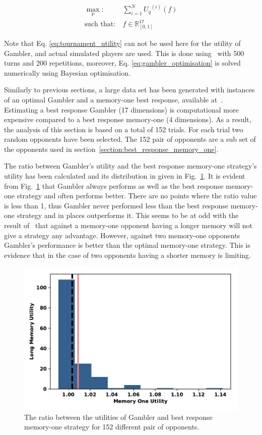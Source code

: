 \documentclass[10pt]{article}
\newcommand{\R}{\mathbb{R}}
\begin{document}
\begin{equation}\label{eq:gambler_optimisation}
    \begin{aligned}
    \max_p: & \ \sum_{i=1} ^ {N} {U_q}^{(i)} (f)
    \\
    \text{such that}: & \ f \in \R_{[0, 1]}^{17}
    \end{aligned}
\end{equation}

Note that Eq. \ref{eq:tournament_utility} can not be used here for the utility
of Gambler, and actual simulated players are used. This is done using~\cite{axelrodproject}
with 500 turns and 200 repetitions, moreover, Eq. \ref{eq:gambler_optimisation}
is solved numerically using Bayesian optimisation.

Similarly to previous sections, a large data set has been generated with
instances of an optimal Gambler and a memory-one best response, available
at~\cite{glynatsi2019}. Estimating a best response Gambler (17 dimensions) is
computational more expensive compared to a best response memory-one (4
dimensions). As a result, the analysis of this section is based on a total of
152 trials. For each trial two random opponents have been selected. The 152 pair
of opponents are a sub set of the opponents used in section~\ref{section:best_response_memory_one}.

The ratio between Gambler's utility and the best response memory-one strategy's utility has been calculated and its distribution in
given in Fig.~\ref{fig:utilities_gambler_mem_one}.
It is evident from Fig.~\ref{fig:utilities_gambler_mem_one} that
Gambler always performs as well as the best response memory-one strategy and often performs better. There are
no points where the ratio value is less than 1, thus Gambler never performed less
than the best response memory-one strategy and in places outperforms it. This seems to be at odd with the
result of~\cite{Press2012} that against a memory-one opponent having a longer memory
will not give a strategy any
advantage. However, against two memory-one opponents Gambler's performance is better than
the optimal memory-one strategy. This is evidence that in the case of two opponents having a
shorter memory is limiting.

\begin{figure}[!htbp]
    \centering
    \includegraphics[width=.5\textwidth]{img/gambler_performance_against_mem_one.pdf}
    \caption{The ratio between the utilities of Gambler and best response memory-one
    strategy for 152 different pair of opponents.}\label{fig:utilities_gambler_mem_one}
\end{figure}
\end{document}
